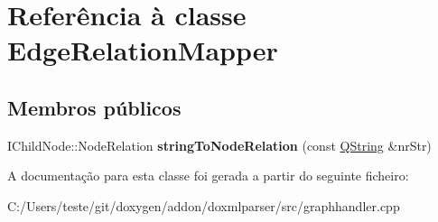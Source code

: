 \hypertarget{class_edge_relation_mapper}{\section{Referência à classe Edge\-Relation\-Mapper}
\label{class_edge_relation_mapper}
}
\subsection*{Membros públicos}
\begin{DoxyCompactItemize}
\item 
\hypertarget{class_edge_relation_mapper_a869e429ca75084b91a14bf2a27ce721e}{I\-Child\-Node\-::\-Node\-Relation {\bfseries string\-To\-Node\-Relation} (const \hyperlink{class_q_string}{Q\-String} \&nr\-Str)}\label{class_edge_relation_mapper_a869e429ca75084b91a14bf2a27ce721e}

\end{DoxyCompactItemize}


A documentação para esta classe foi gerada a partir do seguinte ficheiro\-:\begin{DoxyCompactItemize}
\item 
C\-:/\-Users/teste/git/doxygen/addon/doxmlparser/src/graphhandler.\-cpp\end{DoxyCompactItemize}
